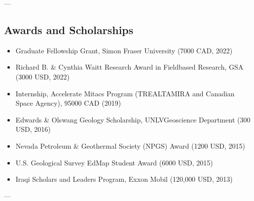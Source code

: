 \documentclass[letterpaper,10pt,english]{sphinxmanual}
\begin{document}
\sphinxAtStartPar
—


\subsection{Awards and Scholarships}
\label{\detokenize{CV_Mahmud_2023:awards-and-scholarships}}\begin{itemize}
\item {} 
\sphinxAtStartPar
Graduate Fellowship Grant, Simon Fraser University (7000 CAD, 2022)

\item {} 
\sphinxAtStartPar
Richard B. \& Cynthia Waitt Research Award in Field\sphinxhyphen{}based Research, GSA (3000 USD, 2022)

\item {} 
\sphinxAtStartPar
Internship, Accelerate Mitacs Program (TREALTAMIRA and Canadian Space Agency), 95000 CAD (2019)

\item {} 
\sphinxAtStartPar
Edwards \& Olswang Geology Scholarship, UNLV\sphinxhyphen{}Geoscience Department (300 USD, 2016)

\item {} 
\sphinxAtStartPar
Nevada Petroleum \& Geothermal Society (NPGS) Award (1200 USD, 2015)

\item {} 
\sphinxAtStartPar
U.S. Geological Survey EdMap Student Award (6000 USD, 2015)

\item {} 
\sphinxAtStartPar
Iraqi Scholars and Leaders Program, Exxon Mobil (120,000 USD, 2013)

\end{itemize}

\sphinxAtStartPar
—
\end{document}
